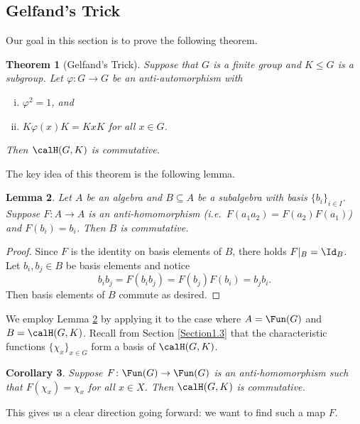 \documentclass[11pt]{amsart}
\newtheorem{thm}{Theorem}
\newtheorem{lem}[thm]{Lemma}
\newtheorem{cor}[thm]{Corollary}
\theoremstyle{remark}
\begin{document}
\subsection{Gelfand's Trick}\label{Section1.7}
Our goal in this section is to prove the following theorem.
\begin{thm}[Gelfand's Trick] \label{theorem: Gelfand's_Trick}
	Suppose that $G$ is a finite group and $K\leq G$ is a subgroup.
	Let $\varphi\colon G\to G$ be an anti-automorphism with
	\begin{enumerate}[(i)]
		\item $\varphi^2=1$, and
		\item $K\varphi(x)K=KxK$ for all $x\in G$.
	\end{enumerate}
	Then $\calH(G,K)$ is commutative.
\end{thm}
The key idea of this theorem is the following lemma.
\begin{lem}\label{lemma: subalgebra_commutative}
	Let $A$ be an algebra and $B\subseteq A$ be a subalgebra with basis $\{b_i\}_{i\in I}$.
	Suppose $F\colon A\to A$ is an anti-homomorphism (i.e.\ $F(a_1a_2)=F(a_2)F(a_1)$) and $F(b_i) = b_i$.
	Then $B$ is commutative.
\end{lem}
\begin{proof}
	Since $F$ is the identity on basis elements of $B$, there holds $F|_B = \Id_B$.
	Let $b_i,b_j\in B$ be basis elements and notice
	\[
		b_ib_j = F(b_ib_j) = F(b_j)F(b_i) = b_jb_i.
	\]
	Then basis elements of $B$ commute as desired.
\end{proof}
We employ Lemma \ref{lemma: subalgebra_commutative} by applying it to the case where $A=\Fun(G)$ and $B=\calH(G,K)$. Recall from Section \ref{Section1.3} that the characteristic functions $\{\chi_x\}_{x\in G}$ form a basis of $\calH(G,K)$.
\begin{cor}\label{cor: comm}
	Suppose $F\colon \Fun(G) \to \Fun(G)$ is an anti-homomorphism such that $F(\chi_x) = \chi_x$ for all $x\in X$.
	Then $\calH(G,K)$ is commutative.
\end{cor}
This gives us a clear direction going forward: we want to find such a map $F$.
\end{document}
